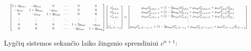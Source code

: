 \begin{align} \label{eqs:adi-system-half}
  \resizebox{\textwidth}{!}{$
  \begin{bmatrix}
    1 + 2\mu_{mx} & -2\mu_{mx} & 0 & \cdots & 0 & 0\\
    -\mu_{mx} & 1 + 2\mu_{mx} & -\mu_{mx} & \cdots & 0 & 0\\
    0 & -\mu_{mx} & 1 + 2\mu_{mx} & \cdots & 0 & 0\\
    \vdots & \vdots & \vdots & \ddots & \vdots & \vdots\\
    0 & 0 & 0 & \cdots & 1 + 2\mu_{mx} & -\mu_{mx}\\
    0 & 0 & 0 & \cdots & -2\mu_{mx} & 1 + 2\mu_{mx}
  \end{bmatrix}
  \begin{bmatrix}
    c^*_{m,0,j}\\
    c^*_{m,1,j}\\
    c^*_{m,2,j}\\
    \vdots\\
    c^*_{m,N-1,j}
  \end{bmatrix}
  =
  \begin{bmatrix}
    \mu_{my}c^n_{m,0,j-1}+(1-2\mu_{my})c^n_{m,0,j}+\mu_{my}c^n_{m,0,j+1}+\mu_m c^n_{1,0,j}c^n_{2,0,j}\\
    \mu_{my}c^n_{m,1,j-1}+(1-2\mu_{my})c^n_{m,1,j}+\mu_{my}c^n_{m,1,j+1}+\mu_m c^n_{1,1,j}c^n_{2,1,j}\\
    \mu_{my}c^n_{m,2,j-1}+(1-2\mu_{my})c^n_{m,2,j}+\mu_{my}c^n_{m,2,j+1}+\mu_m c^n_{1,2,j}c^n_{2,2,j}\\
    \vdots\\
    \mu_{my}c^n_{m,N-1,j-1}+(1-2\mu_{my})c^n_{m,N-1,j}+\mu_{my}c^n_{m,N-1,j+1}+\mu_m c^n_{1,N-1,j}c^n_{2,N-1,j}
  \end{bmatrix}
  $}
\end{align}

Lygčių sistemos sekančio laiko žingsnio sprendiniui $c^{n+1}$:

